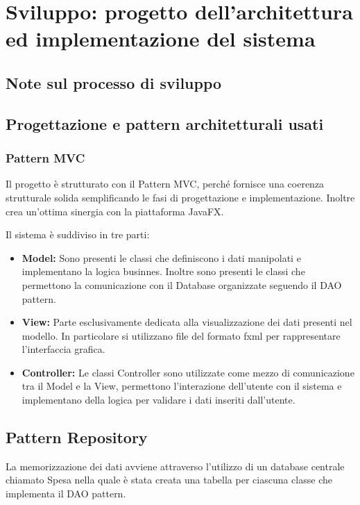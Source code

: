 \documentclass{article}
\begin{document}
\newpage
\section{Sviluppo: progetto dell'architettura ed implementazione del sistema}
\subsection{Note sul processo di sviluppo}
\subsection{Progettazione e pattern architetturali usati}
\subsubsection{Pattern MVC}
Il progetto è strutturato con il Pattern MVC, perché fornisce una coerenza strutturale solida
semplificando le fasi di progettazione e implementazione. Inoltre crea un'ottima sinergia con la
piattaforma JavaFX.

\noindent Il sistema è suddiviso in tre parti:
\begin{itemize}
	\item{\textbf{Model:}
	      Sono presenti le classi che definiscono i dati manipolati
	      e implementano la logica businnes.
	      Inoltre sono presenti le classi che permettono la comunicazione
	      con il Database organizzate seguendo il DAO pattern.
	      }
	\item{\textbf{View:}
	      Parte esclusivamente dedicata alla visualizzazione dei dati
	      presenti nel modello.
	      In particolare si utilizzano file del formato fxml per rappresentare
	      l'interfaccia grafica.
	      }
	\item{\textbf{Controller:}
	      Le classi Controller sono utilizzate come mezzo di comunicazione
	      tra il Model e la View, permettono l'interazione dell'utente con il
	      sistema e implementano della logica per validare i dati inseriti dall'utente.
	      }
\end{itemize}

\subsection{Pattern Repository}
\noindent La memorizzazione dei dati avviene attraverso l'utilizzo di un database centrale chiamato Spesa nella quale è stata creata una tabella per ciascuna classe che implementa il DAO pattern.
\end{document}
